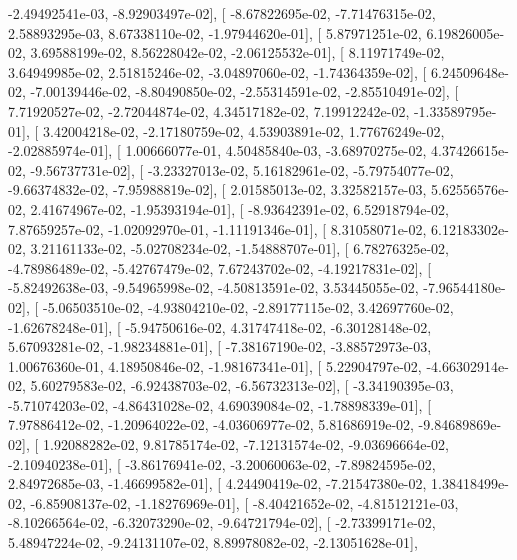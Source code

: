 \documentclass{article}
\begin{document}
         -2.49492541e-03,  -8.92903497e-02],
       [ -8.67822695e-02,  -7.71476315e-02,   2.58893295e-03,
          8.67338110e-02,  -1.97944620e-01],
       [  5.87971251e-02,   6.19826005e-02,   3.69588199e-02,
          8.56228042e-02,  -2.06125532e-01],
       [  8.11971749e-02,   3.64949985e-02,   2.51815246e-02,
         -3.04897060e-02,  -1.74364359e-02],
       [  6.24509648e-02,  -7.00139446e-02,  -8.80490850e-02,
         -2.55314591e-02,  -2.85510491e-02],
       [  7.71920527e-02,  -2.72044874e-02,   4.34517182e-02,
          7.19912242e-02,  -1.33589795e-01],
       [  3.42004218e-02,  -2.17180759e-02,   4.53903891e-02,
          1.77676249e-02,  -2.02885974e-01],
       [  1.00666077e-01,   4.50485840e-03,  -3.68970275e-02,
          4.37426615e-02,  -9.56737731e-02],
       [ -3.23327013e-02,   5.16182961e-02,  -5.79754077e-02,
         -9.66374832e-02,  -7.95988819e-02],
       [  2.01585013e-02,   3.32582157e-03,   5.62556576e-02,
          2.41674967e-02,  -1.95393194e-01],
       [ -8.93642391e-02,   6.52918794e-02,   7.87659257e-02,
         -1.02092970e-01,  -1.11191346e-01],
       [  8.31058071e-02,   6.12183302e-02,   3.21161133e-02,
         -5.02708234e-02,  -1.54888707e-01],
       [  6.78276325e-02,  -4.78986489e-02,  -5.42767479e-02,
          7.67243702e-02,  -4.19217831e-02],
       [ -5.82492638e-03,  -9.54965998e-02,  -4.50813591e-02,
          3.53445055e-02,  -7.96544180e-02],
       [ -5.06503510e-02,  -4.93804210e-02,  -2.89177115e-02,
          3.42697760e-02,  -1.62678248e-01],
       [ -5.94750616e-02,   4.31747418e-02,  -6.30128148e-02,
          5.67093281e-02,  -1.98234881e-01],
       [ -7.38167190e-02,  -3.88572973e-03,   1.00676360e-01,
          4.18950846e-02,  -1.98167341e-01],
       [  5.22904797e-02,  -4.66302914e-02,   5.60279583e-02,
         -6.92438703e-02,  -6.56732313e-02],
       [ -3.34190395e-03,  -5.71074203e-02,  -4.86431028e-02,
          4.69039084e-02,  -1.78898339e-01],
       [  7.97886412e-02,  -1.20964022e-02,  -4.03606977e-02,
          5.81686919e-02,  -9.84689869e-02],
       [  1.92088282e-02,   9.81785174e-02,  -7.12131574e-02,
         -9.03696664e-02,  -2.10940238e-01],
       [ -3.86176941e-02,  -3.20060063e-02,  -7.89824595e-02,
          2.84972685e-03,  -1.46699582e-01],
       [  4.24490419e-02,  -7.21547380e-02,   1.38418499e-02,
         -6.85908137e-02,  -1.18276969e-01],
       [ -8.40421652e-02,  -4.81512121e-03,  -8.10266564e-02,
         -6.32073290e-02,  -9.64721794e-02],
       [ -2.73399171e-02,   5.48947224e-02,  -9.24131107e-02,
          8.89978082e-02,  -2.13051628e-01],
\end{document}
